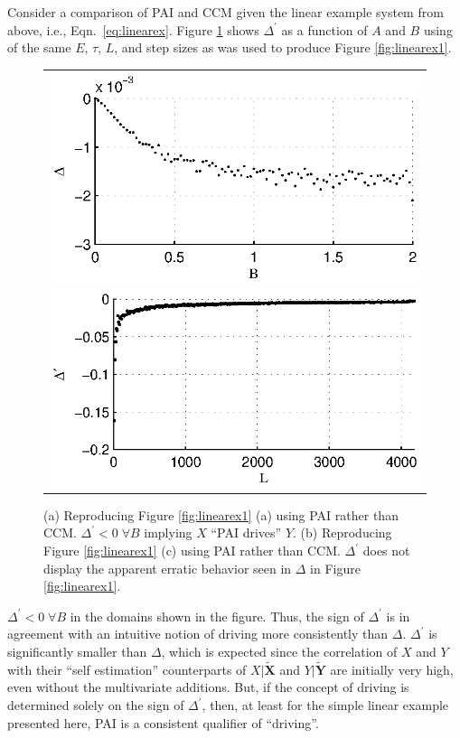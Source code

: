 \documentclass[twocolumn,aps,pre,groupedaddress]{revtex4-1}
\begin{document}
Consider a comparison of PAI and CCM given the linear example system from above, i.e., Eqn.\ \ref{eq:linearex}.  Figure \ref{fig:linearExPAI} shows $\Delta^\prime$ as a function of $A$ and $B$ using of the same $E$, $\tau$, $L$, and step sizes as was used to produce Figure \ref{fig:linearex1}.
\begin{figure}[ht]
\begin{tabular}{c}
\includegraphics[scale=0.8]{LinearExPAI.eps} \\
\includegraphics[scale=0.8]{LinearExPAIChangeL.eps} \\
\end{tabular}
\caption{(a) Reproducing Figure \ref{fig:linearex1} (a) using PAI rather than CCM.  $\Delta^\prime<0\;\forall B$ implying $X$ ``PAI drives'' $Y$. (b) Reproducing Figure \ref{fig:linearex1} (c) using PAI rather than CCM.  $\Delta^\prime$ does not display the apparent erratic behavior seen in $\Delta$ in Figure \ref{fig:linearex1}.}
\label{fig:linearExPAI}
\end{figure}
$\Delta^\prime<0\;\forall B$ in the domains shown in the figure.  Thus, the sign of $\Delta^\prime$ is in agreement with an intuitive notion of driving more consistently than $\Delta$.  $\Delta^\prime$ is significantly smaller than $\Delta$, which is expected since the correlation of $X$ and $Y$ with their ``self estimation'' counterparts of $X|\tilde{\mathbf{X}}$ and $Y|\tilde{\mathbf{Y}}$ are initially very high, even without the multivariate additions.  But, if the concept of driving is determined solely on the sign of $\Delta^\prime$, then, at least for the simple linear example presented here, PAI is a consistent qualifier of ``driving''.
\end{document}
